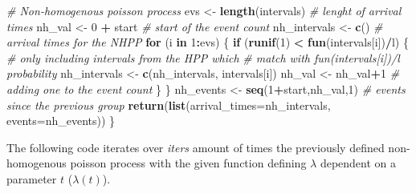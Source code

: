 \documentclass[]{article}
\newenvironment{Shaded}{\begin{snugshade}}{\end{snugshade}}
\newcommand{\CommentTok}[1]{\textcolor[rgb]{0.56,0.35,0.01}{\textit{#1}}}
\newcommand{\ControlFlowTok}[1]{\textcolor[rgb]{0.13,0.29,0.53}{\textbf{#1}}}
\newcommand{\DataTypeTok}[1]{\textcolor[rgb]{0.13,0.29,0.53}{#1}}
\newcommand{\DecValTok}[1]{\textcolor[rgb]{0.00,0.00,0.81}{#1}}
\newcommand{\KeywordTok}[1]{\textcolor[rgb]{0.13,0.29,0.53}{\textbf{#1}}}
\newcommand{\NormalTok}[1]{#1}
\newcommand{\OperatorTok}[1]{\textcolor[rgb]{0.81,0.36,0.00}{\textbf{#1}}}
\newcommand{\StringTok}[1]{\textcolor[rgb]{0.31,0.60,0.02}{#1}}
\begin{document}
\begin{Shaded}
\begin{Highlighting}[]
    \CommentTok{# Non-homogenous poisson process}
\NormalTok{    evs <-}\StringTok{ }\KeywordTok{length}\NormalTok{(intervals) }\CommentTok{# lenght of arrival times }
\NormalTok{    nh_val <-}\StringTok{ }\DecValTok{0} \OperatorTok{+}\StringTok{ }\NormalTok{start }\CommentTok{# start of the event count}
\NormalTok{    nh_intervals <-}\StringTok{ }\KeywordTok{c}\NormalTok{() }\CommentTok{# arrival times for the NHPP}
    \ControlFlowTok{for}\NormalTok{ (i }\ControlFlowTok{in} \DecValTok{1}\OperatorTok{:}\NormalTok{evs) \{}
        \ControlFlowTok{if}\NormalTok{ (}\KeywordTok{runif}\NormalTok{(}\DecValTok{1}\NormalTok{) }\OperatorTok{<}\StringTok{ }\KeywordTok{fun}\NormalTok{(intervals[i])}\OperatorTok{/}\NormalTok{l) \{ }
            \CommentTok{# only including intervals from the HPP which}
            \CommentTok{# match with fun(intervals[i])/l probability}
\NormalTok{            nh_intervals <-}\StringTok{ }\KeywordTok{c}\NormalTok{(nh_intervals, intervals[i]) }
\NormalTok{            nh_val <-}\StringTok{ }\NormalTok{nh_val}\OperatorTok{+}\DecValTok{1} \CommentTok{# adding one to the event count}
\NormalTok{        \}}
\NormalTok{    \}}
\NormalTok{    nh_events <-}\StringTok{ }\KeywordTok{seq}\NormalTok{(}\DecValTok{1}\OperatorTok{+}\NormalTok{start,nh_val,}\DecValTok{1}\NormalTok{) }\CommentTok{# events since the previous group}
    \KeywordTok{return}\NormalTok{(}\KeywordTok{list}\NormalTok{(}\DataTypeTok{arrival_times=}\NormalTok{nh_intervals, }\DataTypeTok{events=}\NormalTok{nh_events))}
\NormalTok{\}}
\end{Highlighting}
\end{Shaded}

\newpage

The following code iterates over \emph{iters} amount of times the
previously defined non-homogenous poisson process with the given
function defining \(\lambda\) dependent on a parameter \(t\)
(\(\lambda (t)\)).
\end{document}
